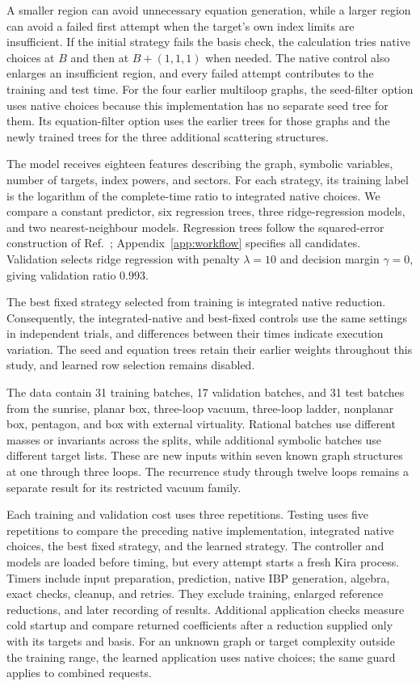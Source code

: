 A smaller region can avoid unnecessary equation generation, while a larger region can avoid a failed first attempt when the target's own index limits are insufficient. If the initial strategy fails the basis check, the calculation tries native choices at $B$ and then at $B+(1,1,1)$ when needed. The native control also enlarges an insufficient region, and every failed attempt contributes to the training and test time. For the four earlier multiloop graphs, the seed-filter option uses native choices because this implementation has no separate seed tree for them. Its equation-filter option uses the earlier trees for those graphs and the newly trained trees for the three additional scattering structures.

The model receives eighteen features describing the graph, symbolic variables, number of targets, index powers, and sectors. For each strategy, its training label is the logarithm of the complete-time ratio to integrated native choices. We compare a constant predictor, six regression trees, three ridge-regression models, and two nearest-neighbour models. Regression trees follow the squared-error construction of Ref.~\cite{CART1984}; Appendix~\ref{app:workflow} specifies all candidates. Validation selects ridge regression with penalty $\lambda=10$ and decision margin $\gamma=0$, giving validation ratio $0.993$.

The best fixed strategy selected from training is integrated native reduction. Consequently, the integrated-native and best-fixed controls use the same settings in independent trials, and differences between their times indicate execution variation. The seed and equation trees retain their earlier weights throughout this study, and learned row selection remains disabled.

The data contain 31 training batches, 17 validation batches, and 31 test batches from the sunrise, planar box, three-loop vacuum, three-loop ladder, nonplanar box, pentagon, and box with external virtuality. Rational batches use different masses or invariants across the splits, while additional symbolic batches use different target lists. These are new inputs within seven known graph structures at one through three loops. The recurrence study through twelve loops remains a separate result for its restricted vacuum family.

Each training and validation cost uses three repetitions. Testing uses five repetitions to compare the preceding native implementation, integrated native choices, the best fixed strategy, and the learned strategy. The controller and models are loaded before timing, but every attempt starts a fresh Kira process. Timers include input preparation, prediction, native IBP generation, algebra, exact checks, cleanup, and retries. They exclude training, enlarged reference reductions, and later recording of results. Additional application checks measure cold startup and compare returned coefficients after a reduction supplied only with its targets and basis. For an unknown graph or target complexity outside the training range, the learned application uses native choices; the same guard applies to combined requests.

